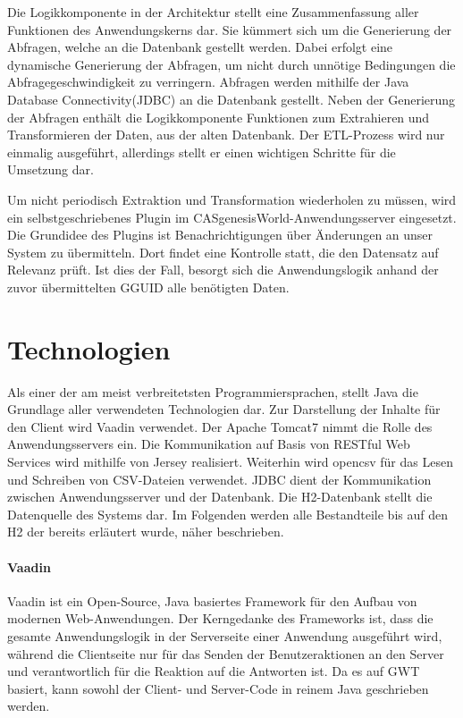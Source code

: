Die Logikkomponente in der Architektur stellt eine Zusammenfassung aller Funktionen des Anwendungskerns dar. Sie kümmert sich um die Generierung der Abfragen, welche an die Datenbank gestellt werden. Dabei erfolgt eine dynamische Generierung der Abfragen, um nicht durch unnötige Bedingungen die Abfragegeschwindigkeit zu verringern. Abfragen werden mithilfe der Java Database Connectivity(JDBC) an die Datenbank gestellt. Neben der Generierung der Abfragen enthält die Logikkomponente Funktionen zum Extrahieren und Transformieren der Daten, aus der alten Datenbank. Der ETL-Prozess wird nur einmalig ausgeführt, allerdings stellt er einen wichtigen  Schritte für die Umsetzung dar. 

Um nicht periodisch Extraktion und Transformation wiederholen zu müssen, wird ein selbstgeschriebenes Plugin im CASgenesisWorld-Anwendungsserver eingesetzt. Die Grundidee des Plugins ist Benachrichtigungen über Änderungen an unser System zu übermitteln. Dort findet eine Kontrolle statt, die den Datensatz auf Relevanz prüft. Ist dies der Fall, besorgt sich die Anwendungslogik anhand der zuvor übermittelten GGUID alle benötigten Daten.

\section{Technologien}

Als einer der am meist verbreitetsten Programmiersprachen, stellt Java die Grundlage aller verwendeten Technologien dar. Zur Darstellung der Inhalte für den Client wird Vaadin verwendet. Der Apache Tomcat7 nimmt die Rolle des Anwendungsservers ein. Die Kommunikation auf Basis von RESTful Web Services wird mithilfe von Jersey realisiert. Weiterhin wird opencsv für das Lesen und Schreiben von CSV-Dateien verwendet. JDBC dient der Kommunikation zwischen Anwendungsserver und der Datenbank. Die H2-Datenbank stellt die Datenquelle des Systems dar. Im Folgenden werden alle Bestandteile bis auf den H2 der bereits erläutert wurde, näher beschrieben. 

\paragraph{Vaadin}

Vaadin ist ein Open-Source, Java basiertes Framework für den Aufbau von modernen Web-Anwendungen. Der Kerngedanke des Frameworks ist, dass die gesamte Anwendungslogik in der Serverseite einer Anwendung ausgeführt wird, während die Clientseite nur für das Senden der Benutzeraktionen an den Server und verantwortlich für die Reaktion auf die Antworten ist. Da es auf GWT basiert, kann sowohl der Client- und Server-Code in reinem Java geschrieben werden.

